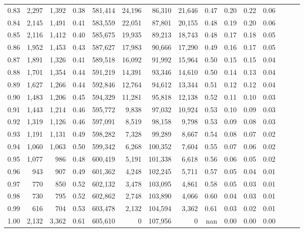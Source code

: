 \begin{tabular}{rrrrrrrrrrrrrrr}
0.83 &   2,297 &  1,392 &  0.38 &  581,414 &   24,196 &   86,310 &   21,646 &  0.47 &  0.20 &  0.22 &      0.06 \\
0.84 &   2,145 &  1,491 &  0.41 &  583,559 &   22,051 &   87,801 &   20,155 &  0.48 &  0.19 &  0.20 &      0.06 \\
0.85 &   2,116 &  1,412 &  0.40 &  585,675 &   19,935 &   89,213 &   18,743 &  0.48 &  0.17 &  0.18 &      0.05 \\
0.86 &   1,952 &  1,453 &  0.43 &  587,627 &   17,983 &   90,666 &   17,290 &  0.49 &  0.16 &  0.17 &      0.05 \\
0.87 &   1,891 &  1,326 &  0.41 &  589,518 &   16,092 &   91,992 &   15,964 &  0.50 &  0.15 &  0.15 &      0.04 \\
0.88 &   1,701 &  1,354 &  0.44 &  591,219 &   14,391 &   93,346 &   14,610 &  0.50 &  0.14 &  0.13 &      0.04 \\
0.89 &   1,627 &  1,266 &  0.44 &  592,846 &   12,764 &   94,612 &   13,344 &  0.51 &  0.12 &  0.12 &      0.04 \\
0.90 &   1,483 &  1,206 &  0.45 &  594,329 &   11,281 &   95,818 &   12,138 &  0.52 &  0.11 &  0.10 &      0.03 \\
0.91 &   1,443 &  1,214 &  0.46 &  595,772 &    9,838 &   97,032 &   10,924 &  0.53 &  0.10 &  0.09 &      0.03 \\
0.92 &   1,319 &  1,126 &  0.46 &  597,091 &    8,519 &   98,158 &    9,798 &  0.53 &  0.09 &  0.08 &      0.03 \\
0.93 &   1,191 &  1,131 &  0.49 &  598,282 &    7,328 &   99,289 &    8,667 &  0.54 &  0.08 &  0.07 &      0.02 \\
0.94 &   1,060 &  1,063 &  0.50 &  599,342 &    6,268 &  100,352 &    7,604 &  0.55 &  0.07 &  0.06 &      0.02 \\
0.95 &   1,077 &    986 &  0.48 &  600,419 &    5,191 &  101,338 &    6,618 &  0.56 &  0.06 &  0.05 &      0.02 \\
0.96 &     943 &    907 &  0.49 &  601,362 &    4,248 &  102,245 &    5,711 &  0.57 &  0.05 &  0.04 &      0.01 \\
0.97 &     770 &    850 &  0.52 &  602,132 &    3,478 &  103,095 &    4,861 &  0.58 &  0.05 &  0.03 &      0.01 \\
0.98 &     730 &    795 &  0.52 &  602,862 &    2,748 &  103,890 &    4,066 &  0.60 &  0.04 &  0.03 &      0.01 \\
0.99 &     616 &    704 &  0.53 &  603,478 &    2,132 &  104,594 &    3,362 &  0.61 &  0.03 &  0.02 &      0.01 \\
1.00 &   2,132 &  3,362 &  0.61 &  605,610 &        0 &  107,956 &        0 &   nan &  0.00 &  0.00 &      0.00 \\
\bottomrule
\end{tabular}
